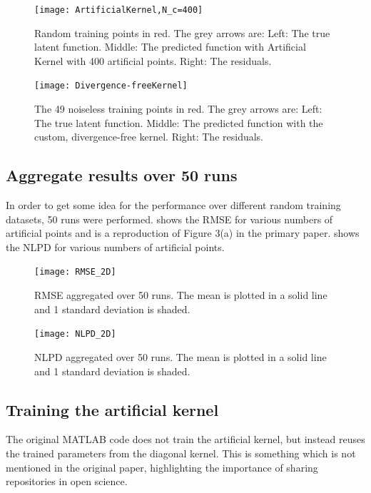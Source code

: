 \documentclass[12pt,a4paper,twoside]{report}
\theoremstyle{definition}
\begin{document}
\begin{figure}[ht]
	\centering
	\texttt{[image: ArtificialKernel,N\_c=400]}
	\caption[Artificial kernel (400 inducing points), random training points]{Random training points in red. The grey arrows are: Left: The true latent function. Middle: The predicted function with Artificial Kernel with 400 artificial points. Right: The residuals.}
	\label{artif400}
\end{figure}

\begin{figure}[ht]
	\centering
	\texttt{[image: Divergence-freeKernel]}
	\caption[Custom kernel, random training points]{The 49 noiseless training points in red. The grey arrows are: Left: The true latent function. Middle: The predicted function with the custom, divergence-free kernel. Right: The residuals.}
\end{figure}

\clearpage
\subsection{Aggregate results over 50 runs}

In order to get some idea for the performance over different random training datasets, 50 runs were performed.  shows the RMSE for various numbers of artificial points and is a reproduction of Figure 3(a) in the primary paper.  shows the NLPD for various numbers of artificial points.
 
\begin{figure}[ht]
	\centering
	\texttt{[image: RMSE\_2D]}
	\caption[RMSE 2D]{RMSE aggregated over 50 runs. The mean is plotted in a solid line and 1 standard deviation is shaded.}
	\label{rmse2d}
\end{figure}

\begin{figure}[ht]
	\centering
	\texttt{[image: NLPD\_2D]}
	\caption[NLPD 2D]{NLPD aggregated over 50 runs. The mean is plotted in a solid line and 1 standard deviation is shaded.}
	\label{nlpd2d}
\end{figure}

\subsection{Training the artificial kernel}\label{sub:trainArtif}
The original MATLAB code does not train the artificial kernel, but instead reuses the trained parameters from the diagonal kernel. This is something which is not mentioned in the original paper, highlighting the importance of sharing repositories in open science.
\end{document}
